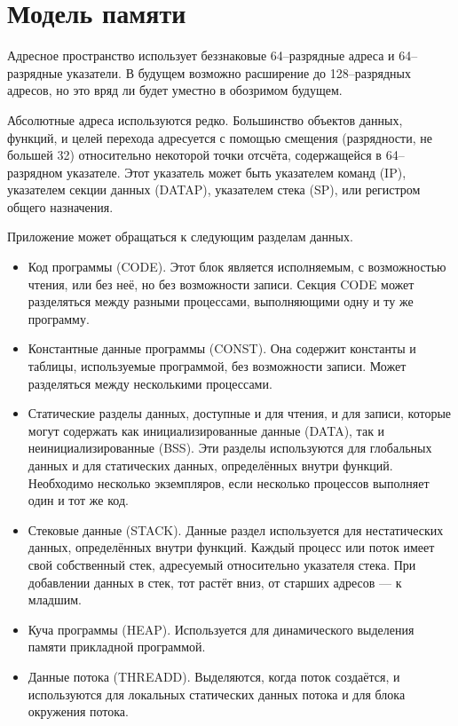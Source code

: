 \documentclass[forwardcom.tex]{subfiles}
\begin{document}
\chapter{Модель памяти} \label{memoryModel}
Адресное пространство использует беззнаковые 64--разрядные адреса и 64--разрядные указатели. В будущем возможно расширение до 128--разрядных адресов, но это вряд ли будет уместно в обозримом будущем.

Абсолютные адреса используются редко. Большинство объектов данных, функций, и целей перехода адресуется с помощью смещения (разрядности, не большей 32) относительно некоторой точки отсчёта, содержащейся в 64--разрядном указателе. Этот указатель может быть указателем команд (IP), указателем секции данных (DATAP), указателем стека (SP), или регистром общего назначения.

Приложение может обращаться к следующим разделам данных.
\begin{itemize}
	\item Код программы (CODE). Этот блок является исполняемым, с возможностью чтения, или без неё, но без возможности записи. Секция CODE может разделяться между разными процессами, выполняющими одну и ту же программу.
	\item Константные данные программы (CONST). Она содержит константы и таблицы, используемые программой, без возможности записи. Может разделяться между несколькими процессами.
	\item Статические разделы данных, доступные и для чтения, и для записи, которые могут содержать как инициализированные данные (DATA), так и неинициализированные (BSS). Эти разделы используются для глобальных данных и для статических данных, определённых внутри функций. Необходимо несколько экземпляров, если несколько процессов выполняет один и тот же код. 
	\item Стековые данные (STACK). Данные раздел используется для нестатических данных, определённых внутри функций. Каждый процесс или поток имеет свой собственный стек, адресуемый относительно указателя стека. При добавлении данных в стек, тот растёт вниз, от старших адресов --- к младшим.
	\item Куча программы (HEAP). Используется для динамического выделения памяти прикладной программой.
	\item Данные потока (THREADD). Выделяются, когда поток создаётся, и используются для локальных статических данных потока и для блока окружения потока.
\end{itemize}
\end{document}
